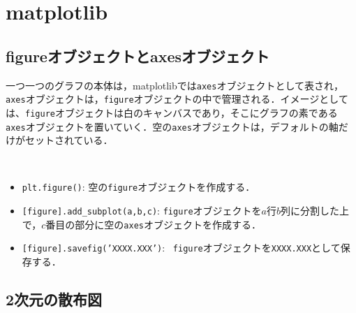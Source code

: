\section{matplotlib}

\subsection{figureオブジェクトとaxesオブジェクト}
一つ一つのグラフの本体は，matplotlibでは\texttt{axes}オブジェクトとして表され，\texttt{axes}オブジェクトは，\texttt{figure}オブジェクトの中で管理される．イメージとしては、\texttt{figure}オブジェクトは白のキャンバスであり，そこにグラフの素である\texttt{axes}オブジェクトを置いていく．空の\texttt{axes}オブジェクトは，デフォルトの軸だけがセットされている．

\begin{gram}　
\begin{itemize}
\item \texttt{plt.figure()}: 空の\texttt{figure}オブジェクトを作成する．
\item \texttt{[figure].add\_subplot(a,b,c)}: \texttt{figure}オブジェクトを$a$行$b$列に分割した上で，$c$番目の部分に空の\texttt{axes}オブジェクトを作成する．
\item \texttt{[figure].savefig('XXXX.XXX')}: ~\texttt{figure}オブジェクトを\texttt{XXXX.XXX}として保存する．
\end{itemize}
\end{gram}

\begin{cod}[\texttt{fig1.py}]　
}]{code/fig1.py}
\vspace{-19pt}
\begin{figure}[H]
\begin{center}
\framed
\texttt{[image: code/fig1.eps]}
\vspace{-16pt}
\caption{\texttt{fig1.eps}}
\endframed
\end{center}
\end{figure}
\end{cod}
\vspace{-20pt}

\subsection{2次元の散布図}

